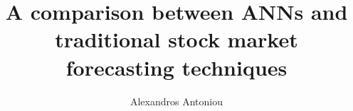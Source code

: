 \author{Alexandros Antoniou}
\title{\bfseries A comparison between ANNs and traditional stock market forecasting techniques}
